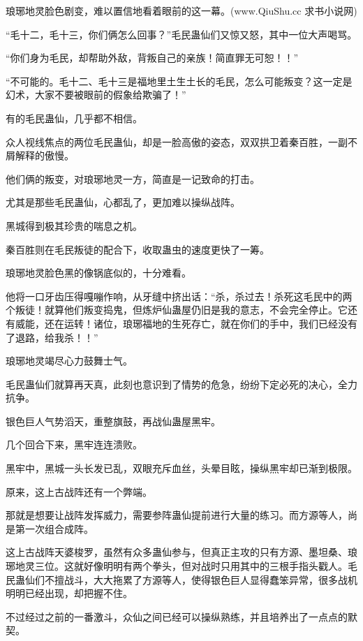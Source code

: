 
\begin{this_body}

琅琊地灵脸色剧变，难以置信地看着眼前的这一幕。(www.QiuShu.cc 求书小说网)

“毛十二，毛十三，你们俩怎么回事？”毛民蛊仙们又惊又怒，其中一位大声喝骂。

“你们身为毛民，却帮助外敌，背叛自己的亲族！简直罪无可恕！！”

“不可能的。毛十二、毛十三是福地里土生土长的毛民，怎么可能叛变？这一定是幻术，大家不要被眼前的假象给欺骗了！”

有的毛民蛊仙，几乎都不相信。

众人视线焦点的两位毛民蛊仙，却是一脸高傲的姿态，双双拱卫着秦百胜，一副不屑解释的傲慢。

他们俩的叛变，对琅琊地灵一方，简直是一记致命的打击。

尤其是那些毛民蛊仙，心都乱了，更加难以操纵战阵。

黑城得到极其珍贵的喘息之机。

秦百胜则在毛民叛徒的配合下，收取蛊虫的速度更快了一筹。

琅琊地灵脸色黑的像锅底似的，十分难看。

他将一口牙齿压得嘎嘣作响，从牙缝中挤出话：“杀，杀过去！杀死这毛民中的两个叛徒！就算他们叛变捣鬼，但炼炉仙蛊屋仍旧是我的意志，不会完全停止。它还有威能，还在运转！诸位，琅琊福地的生死存亡，就在你们的手中，我们已经没有了退路，给我杀！！”

琅琊地灵竭尽心力鼓舞士气。

毛民蛊仙们就算再天真，此刻也意识到了情势的危急，纷纷下定必死的决心，全力抗争。

银色巨人气势滔天，重整旗鼓，再战仙蛊屋黑牢。

几个回合下来，黑牢连连溃败。

黑牢中，黑城一头长发已乱，双眼充斥血丝，头晕目眩，操纵黑牢却已渐到极限。

原来，这上古战阵还有一个弊端。

那就是想要让战阵发挥威力，需要参阵蛊仙提前进行大量的练习。而方源等人，尚是第一次组合成阵。

这上古战阵天婆梭罗，虽然有众多蛊仙参与，但真正主攻的只有方源、墨坦桑、琅琊地灵三位。这就好像明明有两个拳头，但对战时只用其中的三根手指头戳人。毛民蛊仙们不擅战斗，大大拖累了方源等人，使得银色巨人显得蠢笨异常，很多战机明明已经出现，却把握不住。

不过经过之前的一番激斗，众仙之间已经可以操纵熟练，并且培养出了一点点的默契。


\end{this_body}
